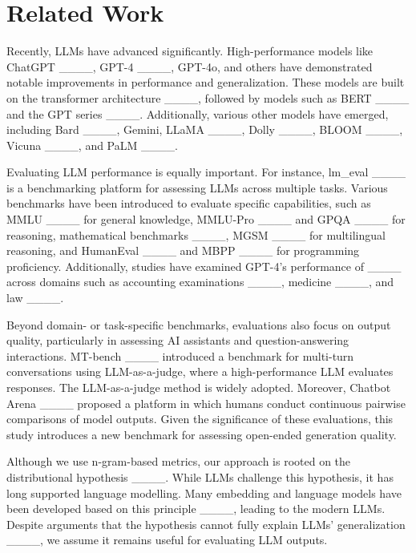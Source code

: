 \section{Related Work}
Recently, LLMs have advanced significantly.
High-performance models like ChatGPT ____, GPT-4 ____, GPT-4o, and others have demonstrated notable improvements in performance and generalization.
These models are built on the transformer architecture ____, followed by models such as BERT ____ and the GPT series ____.
Additionally, various other models have emerged, including Bard ____, Gemini, LLaMA ____, Dolly ____, BLOOM ____, Vicuna ____, and PaLM ____.

Evaluating LLM performance is equally important.
For instance, lm\_eval ____ is a benchmarking platform for assessing LLMs across multiple tasks.
Various benchmarks have been introduced to evaluate specific capabilities, such as MMLU ____ for general knowledge, MMLU-Pro ____ and GPQA ____ for reasoning, mathematical benchmarks ____, MGSM ____ for multilingual reasoning, and HumanEval ____ and MBPP ____ for programming proficiency.
Additionally, studies have examined GPT-4’s performance of ____ across domains such as accounting examinations ____, medicine ____, and law ____.

Beyond domain- or task-specific benchmarks, evaluations also focus on output quality, particularly in assessing AI assistants and question-answering interactions.
MT-bench ____ introduced a benchmark for multi-turn conversations using LLM-as-a-judge, where a high-performance LLM evaluates responses.
The LLM-as-a-judge method is widely adopted.
Moreover, Chatbot Arena ____ proposed a platform in which humans conduct continuous pairwise comparisons of model outputs.
Given the significance of these evaluations, this study introduces a new benchmark for assessing open-ended generation quality.

Although we use n-gram-based metrics, our approach is rooted on the distributional hypothesis ____.
While LLMs challenge this hypothesis, it has long supported language modelling.
Many embedding and language models have been developed based on this principle ____, leading to the modern LLMs.
Despite arguments that the hypothesis cannot fully explain LLMs' generalization ____, we assume it remains useful for evaluating LLM outputs.